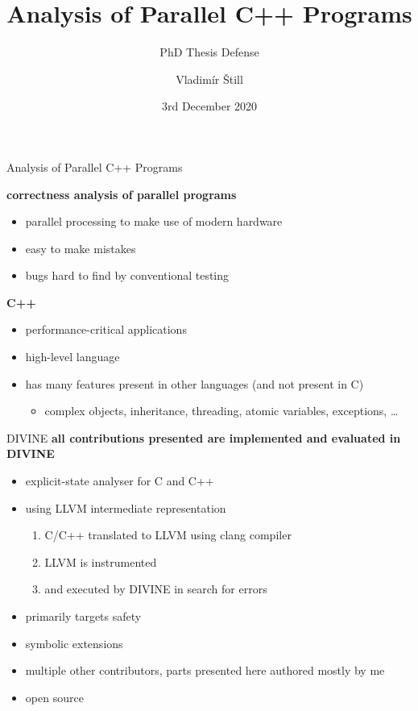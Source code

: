 \documentclass[aspectratio=169, fi]{paradise-slide}
\title{Analysis of Parallel C++ Programs}
\subtitle{PhD Thesis Defense}
\author{Vladimír Štill}
\date{3rd December 2020}
\begin{document}

\begin{frame}{Analysis of Parallel C++ Programs}

\textbf{correctness analysis of parallel programs}
\begin{itemize}
    \item parallel processing to make use of modern hardware
    \item easy to make mistakes
    \item bugs hard to find by conventional testing
\end{itemize}
\pause

\bigskip
\textbf{C++}
\begin{itemize}
  \item performance-critical applications
  \item high-level language
  \item has many features present in other languages (and not present in C)
    \begin{itemize}
      \item complex objects, inheritance, threading, atomic variables, exceptions, …
    \end{itemize}
\end{itemize}
\end{frame}

\begin{frame}{DIVINE}
  \textbf{all contributions presented are implemented and evaluated in DIVINE}

  \begin{itemize}
    \item explicit-state analyser for C and C++
    \item using LLVM intermediate representation
      \begin{enumerate}
        \item C/C++ translated to LLVM using clang compiler
        \item LLVM is instrumented
        \item and executed by DIVINE in search for errors
      \end{enumerate}\pause

    \item primarily targets safety
    \item symbolic extensions
    \item multiple other contributors, parts presented here authored mostly by me
    \item open source
  \end{itemize}
\end{frame}
\end{document}
